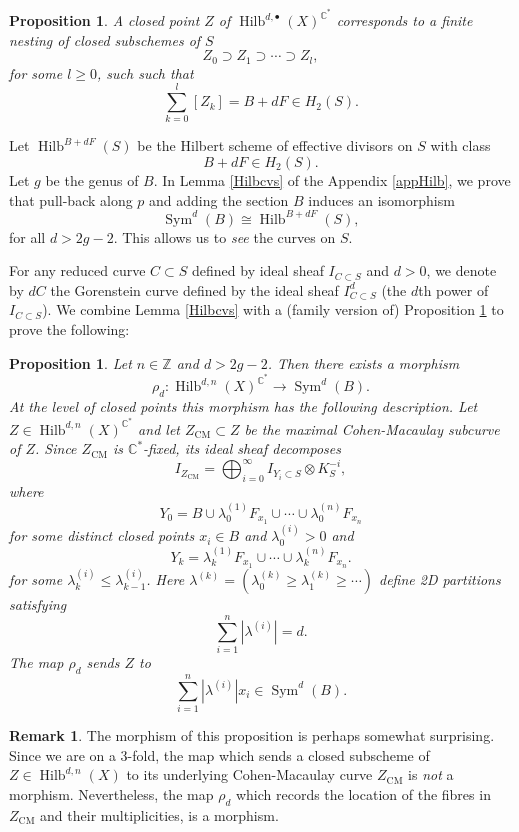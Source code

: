 \documentclass{amsart}
\newtheorem{proposition}[theorem]{Proposition}
\theoremstyle{definition}
\newtheorem{remark}[theorem]{Remark}
\newcommand{\CC} {\mathbb{C}}          %
\newcommand{\ZZ} {\mathbb{Z}}		%
\newcommand{\Sym}{\operatorname{Sym}}
\newcommand{\Hilb}{\operatorname{Hilb}}
\newcommand{\CM}{\operatorname{CM}}
\begin{document}
\begin{proposition} \label{nest}
A closed point $Z$ of $\Hilb^{d,\bullet}(X)^{\CC^*}$ corresponds to a finite nesting of closed subschemes of $S$
$$
Z_{0} \supset Z_{1} \supset \cdots \supset Z_{l},
$$
for some $l \geq 0$, such such that
$$
\sum_{k=0}^{l} [Z_k] = B + dF \in H_2(S).
$$
\end{proposition}
Let $\Hilb^{B+dF}(S)$ be the Hilbert scheme of effective divisors on $S$ with class $$B+dF \in H_2(S).$$ Let $g$ be the genus of $B$. In Lemma \ref{Hilbcvs} of the Appendix \ref{appHilb}, we prove that pull-back along $p$ and adding the section $B$ induces an isomorphism
$$
\Sym^d(B) \cong \Hilb^{B+dF}(S),
$$
for all $d > 2g-2$. This allows us to \emph{see} the curves on $S$. 

For any reduced curve $C \subset S$ defined by ideal sheaf $I_{C \subset S}$ and $d >0$, we denote by $dC$ the Gorenstein curve defined by the ideal sheaf $I_{C \subset S}^d$ (the $d$th power of $I_{C \subset S}$). We combine Lemma \ref{Hilbcvs} with a (family version of) Proposition \ref{nest} to prove the following:
\begin{proposition} \label{proprho}
Let $n \in \ZZ$ and $d > 2g-2$. Then there exists a morphism
$$
\rho_d : \Hilb^{d,n}(X)^{\CC^*} \longrightarrow \Sym^d(B). 
$$
At the level of closed points this morphism has the following description. Let $Z \in \Hilb^{d,n}(X)^{\CC^*}$ and let $Z_{\CM} \subset Z$ be the maximal Cohen-Macaulay subcurve of $Z$. Since $Z_{\CM}$ is $\CC^*$-fixed, its ideal sheaf decomposes
$$
I_{Z_{\CM}} = \bigoplus_{i=0}^{\infty} I_{Y_i \subset S} \otimes K_{S}^{-i},
$$
where 
$$
Y_0 = B \cup \lambda_{0}^{(1)} F_{x_1} \cup \cdots \cup \lambda_{0}^{(n)} F_{x_n}
$$
for some distinct closed points $x_i \in B$ and $\lambda_{0}^{(i)} > 0$ and
$$
Y_k = \lambda_{k}^{(1)} F_{x_1} \cup \cdots \cup \lambda_{k}^{(n)} F_{x_n}.
$$
for some $\lambda_{k}^{(i)} \leq \lambda_{k-1}^{(i)}$. Here $\lambda^{(k)} = (\lambda^{(k)}_{0} \geq \lambda^{(k)}_{1} \geq \cdots)$ define 2D partitions satisfying 
$$
\sum_{i=1}^{n} |\lambda^{(i)}| = d.
$$
The map $\rho_d$ sends $Z$ to 
$$
\sum_{i=1}^{n} |\lambda^{(i)}| x_i \in \Sym^d(B).
$$
\end{proposition}

\begin{remark}
The morphism of this proposition is perhaps somewhat surprising. Since we are on a 3-fold, the map which sends a closed subscheme of $Z \in \Hilb^{d,n}(X)$ to its underlying Cohen-Macaulay curve $Z_{\CM}$ is \emph{not} a morphism. Nevertheless, the map $\rho_d$ which records the location of the fibres in $Z_{\CM}$ and their multiplicities, is a morphism.
\end{remark}
\end{document}
